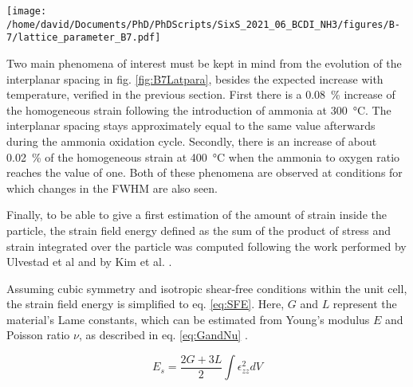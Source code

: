 \begin{SCfigure}
    \centering
    \texttt{[image: /home/david/Documents/PhD/PhDScripts/SixS\_2021\_06\_BCDI\_NH3/figures/B-7/lattice\_parameter\_B7.pdf]}
    \caption{
        Evolution of the interplanar spacing $d_{111}$ and homogeneous strain $\epsilon_{111, homo}$ for particle B as a function of the ammonia to oxygen ratio.
        The reference for the computation of $\epsilon_{111, homo}$ was taken as the mean value at \qty{25}{\degreeCelsius}.
        The reproduction of measurements at fixed conditions yields multiple data points, lines at \qty{300}{\degreeCelsius} and \qty{400}{\degreeCelsius} link the data points in the order of the measurements.
    }
    \label{fig:B7Latpara}
\end{SCfigure}

Two main phenomena of interest must be kept in mind from the evolution of the interplanar spacing in fig. \ref{fig:B7Latpara}, besides the expected increase with temperature, verified in the previous section.
First there is a \qty{0.08}{\percent} increase of the homogeneous strain following the introduction of ammonia at \qty{300}{\degreeCelsius}.
The interplanar spacing stays approximately equal to the same value afterwards during the ammonia oxidation cycle.
Secondly, there is an increase of about \qty{0.02}{\percent} of the homogeneous strain at \qty{400}{\degreeCelsius} when the ammonia to oxygen ratio reaches the value of one.
Both of these phenomena are observed at conditions for which changes in the FWHM are also seen.

Finally, to be able to give a first estimation of the amount of strain inside the particle, the strain field energy defined as the sum of the product of stress and strain integrated over the particle \parencite{Cahn1959} was computed following the work performed by Ulvestad et al \parencite*{Ulvestad2015a} and by Kim et al. \parencite*{Kim2019}.

Assuming cubic symmetry and isotropic shear-free conditions within the unit cell, the strain field energy is simplified to eq. \ref{eq:SFE}.
Here, $G$ and $L$ represent the material's Lame constants, which can be estimated from Young's modulus $E$ and Poisson ratio $\nu$, as described in eq. \ref{eq:GandNu} \parencite{Mavko2020}.

\begin{equation}
    E_s = \frac{2G + 3L}{2} \int \epsilon_{zz}^2 dV
    \label{eq:SFE}
\end{equation}

